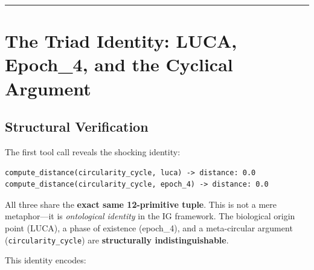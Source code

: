 \documentclass[12pt,a4paper]{article}
\begin{document}
\begin{center}
\rule{0.5\textwidth}{0.4pt}
\end{center}

\section{The Triad Identity: LUCA, Epoch\_4, and the Cyclical Argument}

\subsection{Structural Verification}

The first tool call reveals the shocking identity:

\begin{lstlisting}[caption={Distance computation reveals structural identity}, label={lst:distance_triod}]
compute_distance(circularity_cycle, luca) -> distance: 0.0
compute_distance(circularity_cycle, epoch_4) -> distance: 0.0
\end{lstlisting}

All three share the \textbf{exact same 12-primitive tuple}. This is not a mere metaphor---it is \emph{ontological identity} in the IG framework. The biological origin point (LUCA), a phase of existence (epoch\_4), and a meta-circular argument (\texttt{circularity\_cycle}) are \textbf{structurally indistinguishable}.

This identity encodes:
\end{document}
